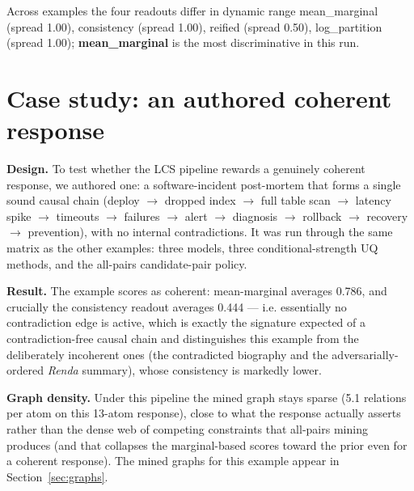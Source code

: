 \documentclass[11pt]{article}
\begin{document}
Across examples the four readouts differ in dynamic range mean\_marginal (spread 1.00), consistency (spread 1.00), reified (spread 0.50), log\_partition (spread 1.00); \textbf{mean\_marginal} is the most discriminative in this run.

\section{Case study: an authored coherent response}

\textbf{Design.} To test whether the LCS pipeline rewards a genuinely coherent response, we authored one: a software-incident post-mortem that forms a single sound causal chain (deploy $\to$ dropped index $\to$ full table scan $\to$ latency spike $\to$ timeouts $\to$ failures $\to$ alert $\to$ diagnosis $\to$ rollback $\to$ recovery $\to$ prevention), with no internal contradictions. It was run through the same matrix as the other examples: three models, three conditional-strength UQ methods, and the all-pairs candidate-pair policy.

\textbf{Result.} The example scores as coherent: mean-marginal averages 0.786, and crucially the consistency readout averages 0.444 --- i.e. essentially no contradiction edge is active, which is exactly the signature expected of a contradiction-free causal chain and distinguishes this example from the deliberately incoherent ones (the contradicted biography and the adversarially-ordered \emph{Renda} summary), whose consistency is markedly lower.

\textbf{Graph density.} Under this pipeline the mined graph stays sparse (5.1 relations per atom on this 13-atom response), close to what the response actually asserts rather than the dense web of competing constraints that all-pairs mining produces (and that collapses the marginal-based scores toward the prior even for a coherent response). The mined graphs for this example appear in Section~\ref{sec:graphs}.
\end{document}
